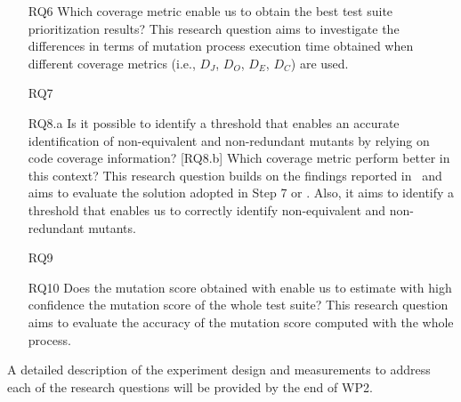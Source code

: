 \begin{itemize}
    \item[RQ6] Which coverage metric enable us to obtain the best test suite prioritization results? This research question aims to investigate the differences in terms of mutation process execution time obtained when different coverage metrics (i.e., $D_J$, $D_O$, $D_E$, $D_C$) are used.
    

    \item[RQ7] 

    \item[RQ8.a] Is it possible to identify a threshold that enables an accurate identification of non-equivalent and non-redundant mutants by relying on code coverage information? [RQ8.b] Which coverage metric perform better in this context? This research question builds on the findings reported in~\cite{schuler2013covering} and aims to evaluate the solution adopted in Step 7 or \APPR. Also, it aims to identify a threshold that enables us to correctly identify non-equivalent and non-redundant mutants.
    
    \item[RQ9] 

    \item[RQ10] Does the mutation score obtained with \APPR enable us to estimate with high confidence the mutation score of the whole test suite? This research question aims to evaluate the accuracy of the mutation score computed with the whole \APPR process.

    
    
    
\end{itemize}

A detailed description of the experiment design and measurements to address each of the research questions will be provided by the end of WP2.